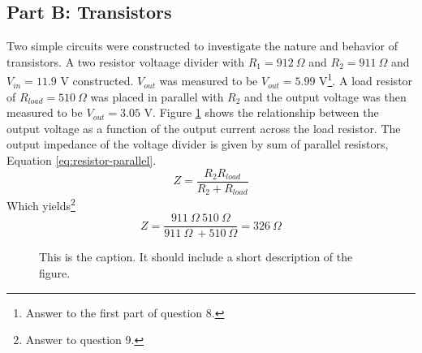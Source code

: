 \documentclass[11pt,onecolumn]{article}
\begin{document}
\subsection{Part B: Transistors}
Two simple circuits were constructed to investigate the nature and behavior of transistors. A two resistor voltaage divider with $R_1 = 912\ \Omega$ and $R_2 = 911\ \Omega$ and $V_{in} = 11.9$ V constructed. $V_{out}$ was measured to be $V_{out} = 5.99$ V\footnote{Answer to the first part of question 8.}. A load resistor of $R_{load} = 510\ \Omega$ was placed in parallel with $R_2$ and the output voltage was then measured to be $V_{out} = 3.05$ V. Figure \ref{fig:plot01} shows the relationship between the output voltage as a function of the output current across the load resistor. The output impedance of the voltage divider is given by sum of parallel resistors, Equation \ref{eq:resistor-parallel}.
\begin{equation}\label{eq:resistor-parallel}
Z = \frac{R_2 R_{load}}{R_2 + R_{load}}
\end{equation}
Which yields\footnote{Answer to question 9.}
\begin{displaymath}
Z = \frac{911\ \Omega\ 510\ \Omega}{911\ \Omega\ + 510\ \Omega} = 326\ \Omega
\end{displaymath}
%
%
\begin{figure}

\caption{This is the caption. It should include a short description of the figure.}\label{fig:plot01}
\end{figure}
\end{document}
